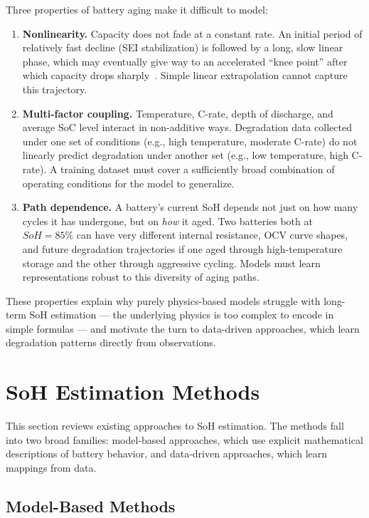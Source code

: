 Three properties of battery aging make it difficult to model:

\begin{enumerate}
    \item \textbf{Nonlinearity.} Capacity does not fade at a constant rate. An initial period of relatively fast decline (SEI stabilization) is followed by a long, slow linear phase, which may eventually give way to an accelerated ``knee point'' after which capacity drops sharply~\autocite{fermincueto2020,severson2019}. Simple linear extrapolation cannot capture this trajectory.

    \item \textbf{Multi-factor coupling.} Temperature, C-rate, depth of discharge, and average SoC level interact in non-additive ways. Degradation data collected under one set of conditions (e.g., high temperature, moderate C-rate) do not linearly predict degradation under another set (e.g., low temperature, high C-rate). A training dataset must cover a sufficiently broad combination of operating conditions for the model to generalize.

    \item \textbf{Path dependence.} A battery's current SoH depends not just on how many cycles it has undergone, but on \emph{how} it aged. Two batteries both at $SoH = 85\%$ can have very different internal resistance, OCV curve shapes, and future degradation trajectories if one aged through high-temperature storage and the other through aggressive cycling. Models must learn representations robust to this diversity of aging paths.
\end{enumerate}

These properties explain why purely physics-based models struggle with long-term SoH estimation --- the underlying physics is too complex to encode in simple formulas --- and motivate the turn to data-driven approaches, which learn degradation patterns directly from observations.


\section{SoH Estimation Methods}
\label{sec:bg_soh_methods}

This section reviews existing approaches to SoH estimation. The methods fall into two broad families: model-based approaches, which use explicit mathematical descriptions of battery behavior, and data-driven approaches, which learn mappings from data.

\subsection{Model-Based Methods}

